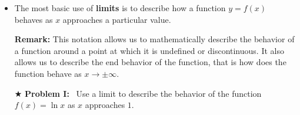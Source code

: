 \documentclass{ximera}  %
\begin{document}
\begin{itemize}
    
    
    
    \vspace{0.1in}
    
    \hspace{0.4in}
    
    
    \vspace{0.2in}
    \item The most basic use of \textbf{limits} is to
    describe how a function $y=f(x)$ behaves as $x$ approaches a
    particular value.
    
    
    
    \newpage
    
    \textbf{Remark:} This notation allows us to mathematically describe the behavior of a function around a point at
    which it is undefined or discontinuous.  It also allows us to describe the end behavior of the function, that is how does
    the function behave as $x \rightarrow \pm \infty$.
    
    
    \vspace{0.2in} \item[$\bigstar$] \textbf{Problem I:} \ Use a limit
    to describe the behavior of the function $f(x)=\ln x$ as $x$
    approaches $1.$

\end{itemize}
\end{document}
